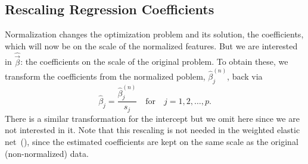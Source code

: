 \subsection{Rescaling Regression Coefficients}

Normalization changes the optimization problem and its solution, the coefficients, which
will now be on the scale of the normalized features. But we are interested in
\(\hat{\vec{\beta}}\): the coefficients on the scale of the original problem. To obtain
these, we transform the coefficients from the normalized poblem, \(\hat\beta^{(n)}_j\),
back via
%
\begin{equation}
  \label{eq:orthogonal-solution}
  \hat\beta_j = \frac{\hat\beta^{(n)}_j}{s_j} \quad\text{for}\quad j = 1,2,\dots,p.
\end{equation}
%
There is a similar transformation for the intercept but we omit here since we are not
interested in it. Note that this rescaling is not needed in the weighted elastic
net~(), since the estimated coefficients are kept on the same
scale as the original (non-normalized) data.
